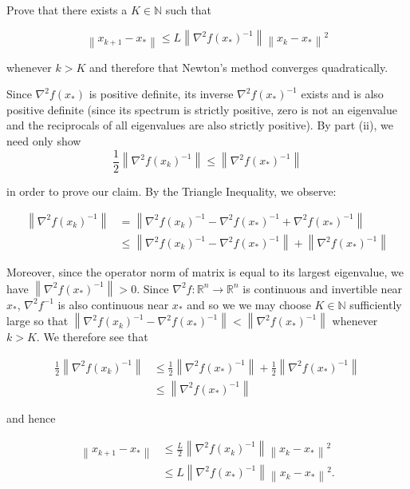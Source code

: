 Prove that there exists a $K \in \mathbb{N}$ such that

$$
\left\lVert x_{k+1} - x_* \right\rVert \le 
    L \left\lVert \nabla^2 f(x_*)^{-1} \right\rVert \left\lVert x_k - x_* \right\rVert^2
$$

whenever $k > K$ and therefore that Newton's method converges quadratically.

\begin{solution}
    Since $\nabla^2 f(x_*)$ is positive definite, its inverse $\nabla^2 f(x_*)^{-1}$ exists and is also positive 
    definite (since its spectrum is strictly positive, zero is not an eigenvalue and the reciprocals of all eigenvalues
    are also strictly positive). By part (ii), we need only show
    $$
        \frac{1}{2} \left\lVert \nabla^2 f(x_k)^{-1} \right\rVert \le \left\lVert \nabla^2 f(x_*)^{-1} \right\rVert
    $$

    in order to prove our claim. By the Triangle Inequality, we observe:

    \begin{align*}
    \left\lVert \nabla^2 f(x_k)^{-1} \right\rVert &= \left\lVert \nabla^2 f(x_k)^{-1} - \nabla^2 f(x_*)^{-1} + \nabla^2 f(x_*)^{-1} \right\rVert \\
                                                  &\le \left\lVert \nabla^2 f(x_k)^{-1} - \nabla^2 f(x_*)^{-1} \right\rVert + \left\lVert \nabla^2 f(x_*)^{-1} \right\rVert 
    \end{align*}

    Moreover, since the operator norm of matrix is equal to its largest eigenvalue, we have 
    $\left\lVert \nabla^2 f(x_*)^{-1} \right\rVert > 0$. Since $\nabla^2 f:\mathbb{R}^n \to \mathbb{R}^n$ is continuous 
    and invertible near $x_*$, $\nabla^2 f^{-1}$ is also continuous near $x_*$ and so we we may choose 
    $K \in \mathbb{N}$ sufficiently large so that 
    $\left\lVert \nabla^2 f(x_k)^{-1} - \nabla^2 f(x_*)^{-1} \right\rVert < \left\lVert \nabla^2 f(x_*)^{-1} \right\rVert$
    whenever $k > K$. We therefore see that 

    \begin{align*}
        \frac{1}{2} \left\lVert \nabla^2 f(x_k)^{-1} \right\rVert &\le \frac{1}{2} \left\lVert \nabla^2 f(x_*)^{-1} \right\rVert + \frac{1}{2} \left\lVert \nabla^2 f(x_*)^{-1} \right\rVert \\
                                                                  &\le \left\lVert \nabla^2 f(x_*)^{-1} \right\rVert
    \end{align*}

    and hence

    \begin{align*}
        \left\lVert x_{k+1} - x_* \right\rVert &\le \frac{L}{2} \left\lVert \nabla^2 f(x_k)^{-1} \right\rVert \left\lVert x_k - x_* \right\rVert^2 \\
                                               &\le L \left\lVert \nabla^2 f(x_*)^{-1} \right\rVert \left\lVert x_k - x_* \right\rVert^2.
    \end{align*}

    \ \\
\end{solution}
